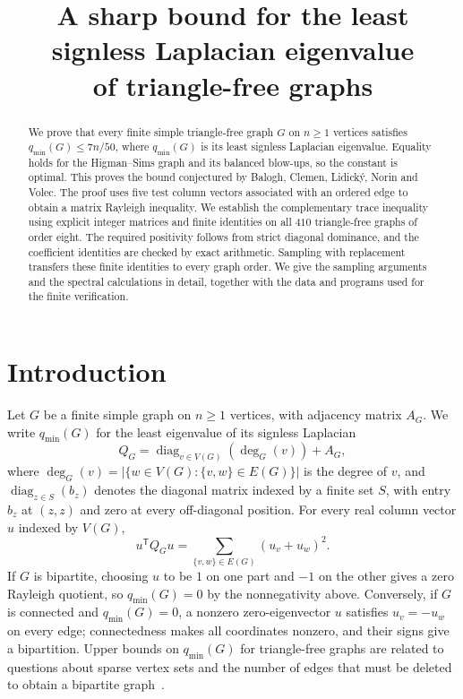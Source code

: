 \documentclass[11pt]{article}
\title{A sharp bound for the least signless Laplacian eigenvalue\\of triangle-free graphs}
\author{}
\date{}
\newcommand{\qmin}{q_{\min}}
\begin{document}
\maketitle
\begin{abstract}
We prove that every finite simple triangle-free graph $G$ on $n\geq1$ vertices
satisfies $\qmin(G)\leq7n/50$, where $\qmin(G)$ is its least signless
Laplacian eigenvalue. Equality holds for the Higman--Sims graph and its
balanced blow-ups, so the constant is optimal. This proves the bound
conjectured by Balogh, Clemen, Lidick\'y, Norin and Volec. The proof uses
five test column vectors associated with an ordered edge to obtain a matrix
Rayleigh inequality. We establish the complementary trace inequality
using explicit integer matrices and finite identities on all $410$
triangle-free graphs of order eight. The required positivity follows
from strict diagonal dominance, and the coefficient identities are
checked by exact arithmetic. Sampling with replacement transfers these
finite identities to every graph order. We give the sampling arguments
and the spectral calculations in detail, together with the data and
programs used for the finite verification.
\end{abstract}

\section{Introduction}\label{sec:introduction}

Let $G$ be a finite simple graph on $n\geq1$ vertices, with adjacency
matrix $A_G$. We write $\qmin(G)$ for the least eigenvalue of its signless
Laplacian
\[
Q_G=\operatorname{diag}_{v\in V(G)}(\deg_G(v))+A_G,
\]
where $\deg_G(v)=|\{w\in V(G):\{v,w\}\in E(G)\}|$ is the degree of $v$,
and $\operatorname{diag}_{z\in S}(b_z)$ denotes the diagonal matrix indexed
by a finite set $S$, with entry $b_z$ at $(z,z)$ and zero at every off-diagonal position.
For every real column vector $u$ indexed by $V(G)$,
\[
u^{\mathsf T}
Q_Gu
=\sum_{\{v,w\}\in E(G)}(u_v+u_w)^2.
\]
If $G$ is bipartite, choosing $u$ to be $1$ on one part and $-1$ on the
other gives a zero Rayleigh quotient, so $\qmin(G)=0$ by the nonnegativity
above.
Conversely, if $G$ is connected and $\qmin(G)=0$, a nonzero zero-eigenvector $u$
satisfies $u_v=-u_w$ on every edge; connectedness makes all coordinates
nonzero, and their signs give a bipartition.
Upper bounds on
$\qmin(G)$ for triangle-free graphs are related to questions about sparse
vertex sets and the number of edges that must be deleted to obtain a
bipartite graph~\cite{BCLNV,Brandt}.
\end{document}
